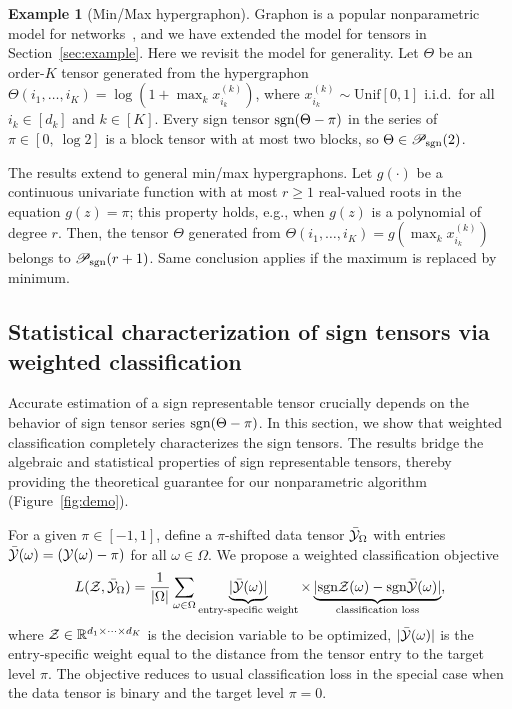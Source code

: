 \documentclass{article}
\theoremstyle{plain}
\theoremstyle{definition}
\newtheorem{example}{Example}
\newcommand*{\KeepStyleUnderBrace}[1]{%
  \mathop{%
    \mathchoice
    {\underbrace{\displaystyle#1}}%
    {\underbrace{\textstyle#1}}%
    {\underbrace{\scriptstyle#1}}%
    {\underbrace{\scriptscriptstyle#1}}%
  }\limits
}
\def\sign{\textup{sgn}}
\def\caliP{\mathscr{P}_{\textup{sgn}}}
\begin{document}
\begin{example}[Min/Max hypergraphon] Graphon is a popular nonparametric model for networks~\cite{chan2014consistent,xu2018rates}, and we have extended the model for tensors in Section~\ref{sec:example}. Here we revisit the model for generality. Let $\Theta$ be an order-$K$ tensor generated from the hypergraphon $\Theta(i_1,\ldots,i_K)=\log(1+\max_kx^{(k)}_{i_k})$, where $x^{(k)}_{i_k}\sim \text{Unif}[0,1]$ i.i.d.\ for all $i_k\in[d_k]$ and $k\in[K]$. Every sign tensor $\sign(\Theta-\pi)$ in the series of $\pi\in[0,\ \log 2]$ is a block tensor with at most two blocks, so $\Theta \in \caliP(2)$. 

The results extend to general min/max hypergraphons. Let $g(\cdot)$ be a continuous univariate function with at most $r\geq 1$ real-valued roots in the equation $g(z)=\pi$; this property holds, e.g., when $g(z)$ is a polynomial of degree $r$. Then, the tensor $\Theta$ generated from $\Theta(i_1,\ldots,i_K)=g(\max_kx^{(k)}_{i_k})$ belongs to $\caliP(r+1)$. Same conclusion applies if the maximum is replaced by minimum.
\end{example}

\subsection{Statistical characterization of sign tensors via weighted classification}\label{sec:identifiability}

Accurate estimation of a sign representable tensor crucially depends on the behavior of sign tensor series $\sign(\Theta-\pi)$. In this section, we show that weighted classification completely characterizes the sign tensors. The results bridge the algebraic and statistical properties of sign representable tensors, thereby providing the theoretical guarantee for our nonparametric algorithm (Figure~\ref{fig:demo}).
 
For a given $\pi \in [-1,1]$, define a $\pi$-shifted data tensor $\bar {\mathcal{Y}}_\Omega$ with entries $\bar {\mathcal{Y}}(\omega) = (\mathcal{Y}(\omega)-\pi)$ for all $\omega\in \Omega$. We propose a weighted classification objective
\begin{equation}\label{eq:sample}
L(\tZ, \bar \tY_\Omega)= {1\over |\Omega|}\sum_{\omega \in \Omega}\KeepStyleUnderBrace{|\bar \tY(\omega)|}_{\text{entry-specific weight}} \times \KeepStyleUnderBrace{| \sign \tZ(\omega)-\sign \bar \tY(\omega)|}_{\text{classification loss}},
\end{equation}
where $\mathcal{Z}\in\mathbb{R}^{d_1\times \cdots \times d_K}$ is the decision variable to be optimized, $|\bar {\mathcal{Y}}(\omega)|$ is the entry-specific weight equal to the distance from the tensor entry to the target level $\pi$. The objective reduces to usual classification loss in the special case when the data tensor is binary and the target level $\pi=0$.
\end{document}
